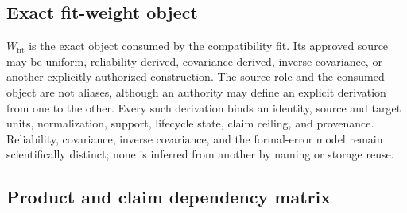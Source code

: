 \subsection{Exact fit-weight object}\label{sec:fit-weights}

$W_{\mathrm{fit}}$ is the exact object consumed by the compatibility fit. Its
approved source may be uniform, reliability-derived, covariance-derived,
inverse covariance, or another explicitly authorized construction. The source
role and the consumed object are not aliases, although an authority may define
an explicit derivation from one to the other. Every such derivation binds an
identity, source and target units, normalization, support, lifecycle state,
claim ceiling, and provenance. Reliability, covariance, inverse covariance,
and the formal-error model remain scientifically distinct; none is inferred
from another by naming or storage reuse.

\subsection{Product and claim dependency matrix}\label{sec:dependencies}


